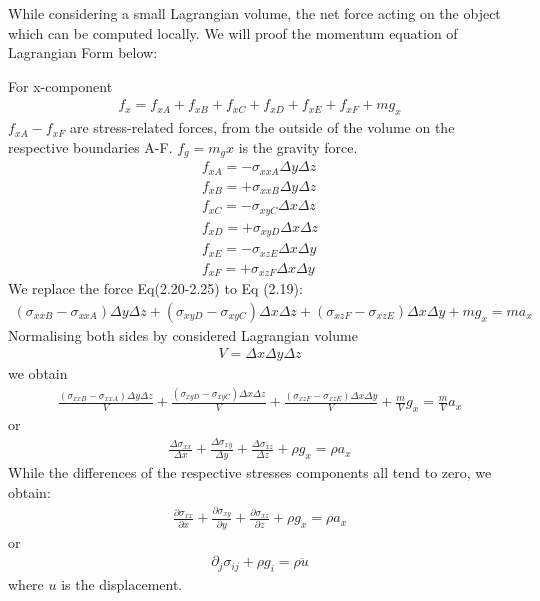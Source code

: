 While considering a small Lagrangian volume, the net force acting on the object which can be computed locally. We will proof the momentum equation of Lagrangian Form below:

For x-component
\begin{align}
f_x=f_{xA}+f_{xB}+f_{xC}+f_{xD}+f_{xE}+f_{xF}+mg_x 
\end{align}
$f_{xA}- f_{xF}$ are stress-related forces, from the outside of the volume on the respective boundaries A-F. 
$f_g=m_gx$ is the gravity force.
\begin{align}
f_{xA} = -\sigma_{xxA}\Delta y\Delta z\\
f_{xB} = +\sigma_{xxB}\Delta y\Delta z\\
f_{xC} = -\sigma_{xyC}\Delta x\Delta z\\
f_{xD} = +\sigma_{xyD}\Delta x\Delta z\\
f_{xE} = -\sigma_{xzE}\Delta x\Delta y\\
f_{xF} = +\sigma_{xzF}\Delta x\Delta y
\end{align}
We replace the force Eq(2.20-2.25) to Eq (2.19):
\begin{align}
(\sigma_{xxB}-\sigma_{xxA})\Delta y\Delta z+(\sigma_{xyD}-\sigma_{xyC})\Delta x\Delta z+(\sigma_{xzF}-\sigma_{xzE})\Delta x\Delta y+mg_x = ma_x 
\end{align}
Normalising both sides by considered Lagrangian volume
\begin{align}
V=\Delta x\Delta y\Delta z
\end{align}
we obtain
\begin{align}
\frac{(\sigma_{xxB}-\sigma_{xxA})\Delta y\Delta z}{V}+\frac{(\sigma_{xyD}-\sigma_{xyC})\Delta x\Delta z}{V}+\frac{(\sigma_{xzF}-\sigma_{xzE})\Delta x\Delta y}{V}+\frac{m}{V}g_x=\frac{m}{V}a_x
\end{align}
or
\begin{align}
\frac{\Delta\sigma_{xx}}{\Delta x}+\frac{\Delta\sigma_{xy}}{\Delta y}+\frac{\Delta\sigma_{xz}}{\Delta z}+\rho g_x = \rho a_x
\end{align}
While the differences of the respective stresses components all tend to zero, we obtain:
\begin{align}
\frac{\partial\sigma_{xx}}{\partial x}+\frac{\partial\sigma_{xy}}{\partial y}+\frac{\partial\sigma_{xz}}{\partial z}+\rho g_x = \rho a_x
\end{align}
or 
\begin{align}
\partial_j\sigma_{ij}+\rho g_i = \rho \ddot u
\end{align}
where $u$ is the displacement.
